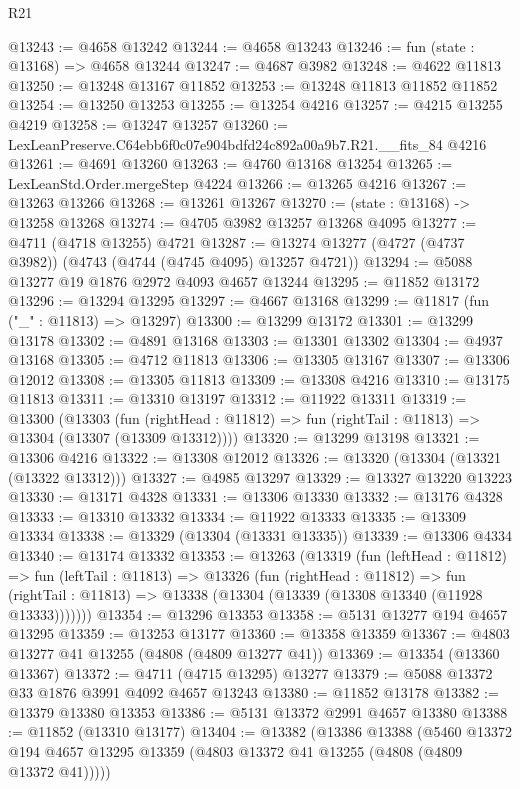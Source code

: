 \begin{lexlean}{R21}
\begin{coremodule}
@13243 := @4658 @13242
@13244 := @4658 @13243
@13246 := fun (state : @13168) => @4658 @13244
@13247 := @4687 @3982
@13248 := @4622 @11813
@13250 := @13248 @13167 @11852
@13253 := @13248 @11813 @11852 @11852
@13254 := @13250 @13253
@13255 := @13254 @4216
@13257 := @4215 @13255 @4219
@13258 := @13247 @13257
@13260 := LexLeanPreserve.C64ebb6f0c07e904bdfd24c892a00a9b7.R21.__fits_84 @4216
@13261 := @4691 @13260
@13263 := @4760 @13168 @13254
@13265 := LexLeanStd.Order.mergeStep @4224
@13266 := @13265 @4216
@13267 := @13263 @13266
@13268 := @13261 @13267
@13270 := (state : @13168) -> @13258 @13268
@13274 := @4705 @3982 @13257 @13268 @4095
@13277 := @4711 (@4718 @13255) @4721
@13287 := @13274 @13277 (@4727 (@4737 @3982)) (@4743 (@4744 (@4745 @4095) @13257 @4721))
@13294 := @5088 @13277 @19 @1876 @2972 @4093 @4657 @13244
@13295 := @11852 @13172
@13296 := @13294 @13295
@13297 := @4667 @13168
@13299 := @11817 (fun ("_" : @11813) => @13297)
@13300 := @13299 @13172
@13301 := @13299 @13178
@13302 := @4891 @13168
@13303 := @13301 @13302
@13304 := @4937 @13168
@13305 := @4712 @11813
@13306 := @13305 @13167
@13307 := @13306 @12012
@13308 := @13305 @11813
@13309 := @13308 @4216
@13310 := @13175 @11813
@13311 := @13310 @13197
@13312 := @11922 @13311
@13319 := @13300
    (@13303
      (fun (rightHead : @11812) => fun (rightTail : @11813) => @13304 (@13307 (@13309 @13312))))
@13320 := @13299 @13198
@13321 := @13306 @4216
@13322 := @13308 @12012
@13326 := @13320 (@13304 (@13321 (@13322 @13312)))
@13327 := @4985 @13297
@13329 := @13327 @13220 @13223
@13330 := @13171 @4328
@13331 := @13306 @13330
@13332 := @13176 @4328
@13333 := @13310 @13332
@13334 := @11922 @13333
@13335 := @13309 @13334
@13338 := @13329 (@13304 (@13331 @13335))
@13339 := @13306 @4334
@13340 := @13174 @13332
@13353 := @13263
    (@13319
      (fun (leftHead : @11812) =>
      fun (leftTail : @11813) =>
      @13326
        (fun (rightHead : @11812) =>
        fun (rightTail : @11813) => @13338 (@13304 (@13339 (@13308 @13340 (@11928 @13333)))))))
@13354 := @13296 @13353
@13358 := @5131 @13277 @194 @4657 @13295
@13359 := @13253 @13177
@13360 := @13358 @13359
@13367 := @4803 @13277 @41 @13255 (@4808 (@4809 @13277 @41))
@13369 := @13354 (@13360 @13367)
@13372 := @4711 (@4715 @13295) @13277
@13379 := @5088 @13372 @33 @1876 @3991 @4092 @4657 @13243
@13380 := @11852 @13178
@13382 := @13379 @13380 @13353
@13386 := @5131 @13372 @2991 @4657 @13380
@13388 := @11852 (@13310 @13177)
@13404 := @13382
    (@13386
      @13388
      (@5460 @13372 @194 @4657 @13295 @13359 (@4803 @13372 @41 @13255 (@4808 (@4809 @13372 @41)))))

\end{coremodule}
\end{lexlean}
